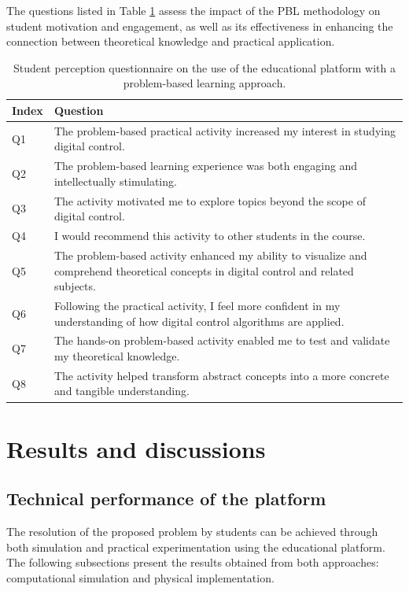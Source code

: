 \documentclass[english]{textolivre}
\begin{document}
The questions listed in Table \ref{tbl-01} assess the impact of the PBL methodology on student motivation and engagement, as well as its effectiveness in enhancing the connection between theoretical knowledge and practical application.

\begin{table}[htpb]
\begin{threeparttable}
\caption{Student perception questionnaire on the use of the educational platform with a problem-based learning approach.}
\label{tbl-01}
\begin{tabular}{lp{13cm}}
\toprule 
Index   & Question    \\ 
\midrule
Q1  & The problem-based practical activity increased my interest in studying digital control. \\
Q2  & The problem-based learning experience was both engaging and intellectually stimulating. \\
Q3  & The activity motivated me to explore topics beyond the scope of digital control. \\
Q4  & I would recommend this activity to other students in the course. \\
Q5  & The problem-based activity enhanced my ability to visualize and comprehend theoretical concepts in digital control and related subjects. \\
Q6  & Following the practical activity, I feel more confident in my understanding of how digital control algorithms are applied. \\
Q7  & The hands-on problem-based activity enabled me to test and validate my theoretical knowledge. \\
Q8  & The activity helped transform abstract concepts into a more concrete and tangible understanding. \\

\bottomrule
\end{tabular}
\end{threeparttable}
\end{table}


\section{Results and discussions}

\subsection{Technical performance of the platform}
The resolution of the proposed problem by students can be achieved through both simulation and practical experimentation using the educational platform. The following subsections present the results obtained from both approaches: computational simulation and physical implementation.
\end{document}

